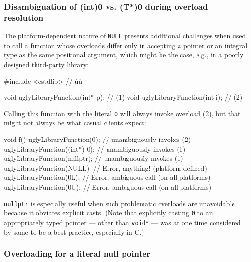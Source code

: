 \subsubsection[Disambiguation of \lstinline!(int)0! vs. \lstinline!(T*)0! during overload resolution]{Disambiguation of {\SubsubsecCode (int)0} vs. {\SubsubsecCode (T*)0} during overload resolution}\label{disambiguation-of-(int)-0-versus-(t*)-0-during-overload-resolution}

The platform-dependent nature of \lstinline!NULL! presents additional
challenges when used to call a function whose overloads differ only in
accepting a pointer or an integral type as the same positional argument, which might be the case, e.g., in a poorly designed third-party
library:

\begin{emcppshiddenlisting}[emcppsbatch=e3]
#include <cstdlib>  // ù{}ù
\end{emcppshiddenlisting}
\begin{emcppslisting}[emcppsbatch=e3]
void uglyLibraryFunction(int* p);  // (1)
void uglyLibraryFunction(int  i);  // (2)
\end{emcppslisting}


\noindent Calling this function with the literal \lstinline!0! will always invoke
overload (2), but that might not always be what casual clients expect:

\begin{emcppslisting}[emcppsbatch=e3]
void f()
{
    uglyLibraryFunction(0);         // unambiguously invokes (2)
    uglyLibraryFunction((int*) 0);  // unambiguously invokes (1)
    uglyLibraryFunction(nullptr);   // unambiguously invokes (1)
    uglyLibraryFunction(NULL);      // Error, anything! (platform-defined)
    uglyLibraryFunction(0L);        // Error, ambiguous call (on all platforms)
    uglyLibraryFunction(0U);        // Error, ambiguous call (on all platforms)
}
\end{emcppslisting}


\noindent\lstinline!nullptr! is especially useful when such problematic overloads
are unavoidable because it obviates explicit
casts. (Note that explicitly casting \lstinline!0! to an
appropriately typed pointer --- other than \lstinline!void*! --- was at one
  time considered by some to be a best practice, especially in C.)

\subsubsection[Overloading for a literal null pointer]{Overloading for a literal null pointer}\label{overloading-for-a-literal-null-pointer}

